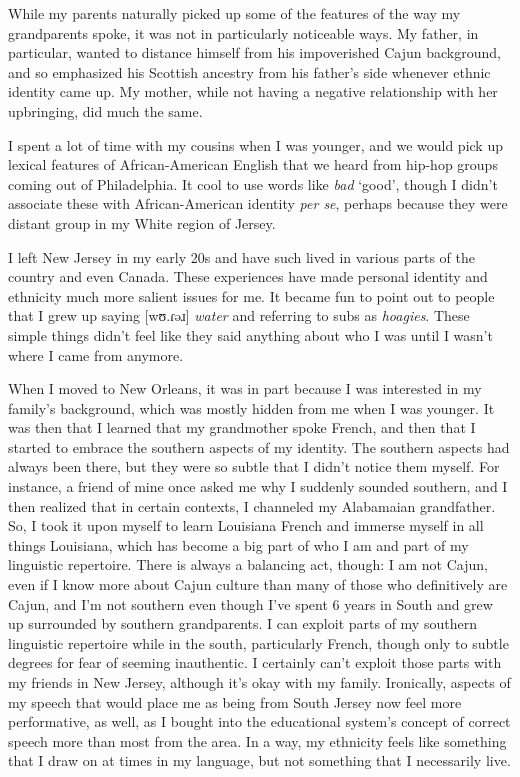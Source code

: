 \documentclass{article}
\begin{document}
  While my parents naturally picked up some of the features of the way my grandparents spoke, it was not in particularly noticeable ways.
  My father, in particular, wanted to distance himself from his impoverished Cajun background, and so emphasized his Scottish ancestry from his father's side whenever ethnic identity came up.
  My mother, while not having a negative relationship with her upbringing, did much the same.

  I spent a lot of time with my cousins when I was younger, and we would pick up lexical features of African-American English that we heard from hip-hop groups coming out of Philadelphia.
  It cool to use words like \emph{bad} `good', though I didn't associate these with African-American identity \emph{per se}, perhaps because they were distant group in my White region of Jersey.

  I left New Jersey in my early 20s and have such lived in various parts of the country and even Canada.
  These experiences have made personal identity and ethnicity much more salient issues for me.
  It became fun to point out to people that I grew up saying [wʊ.ɾəɹ] \emph{water} and referring to subs as \emph{hoagies}.
  These simple things didn't feel like they said anything about who I was until I wasn't where I came from anymore.

  When I moved to New Orleans, it was in part because I was interested in my family's background, which was mostly hidden from me when I was younger.
  It was then that I learned that my grandmother spoke French, and then that I started to embrace the southern aspects of my identity.
  The southern aspects had always been there, but they were so subtle that I didn't notice them myself.
  For instance, a friend of mine once asked me why I suddenly sounded southern, and I then realized that in certain contexts, I channeled my Alabamaian grandfather.
  So, I took it upon myself to learn Louisiana French and immerse myself in all things Louisiana, which has become a big part of who I am and part of my linguistic repertoire.
  There is always a balancing act, though: I am not Cajun, even if I know more about Cajun culture than many of those who definitively are Cajun, and I'm not southern even though I've spent 6 years in South and grew up surrounded by southern grandparents.
  I can exploit parts of my southern linguistic repertoire while in the south, particularly French, though only to subtle degrees for fear of seeming inauthentic.
  I certainly can't exploit those parts with my friends in New Jersey, although it's okay with my family.
  Ironically, aspects of my speech that would place me as being from South Jersey now feel more performative, as well, as I bought into the educational system's concept of correct speech more than most from the area.
  In a way, my ethnicity feels like something that I draw on at times in my language, but not something that I necessarily live.
\end{document}
